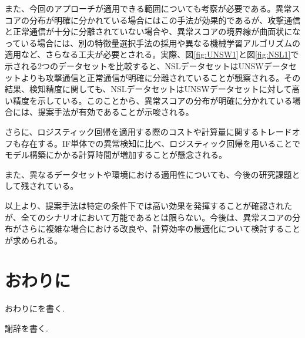 \documentclass{css}
\begin{document}
また、今回のアプローチが適用できる範囲についても考察が必要である。異常スコアの分布が明確に分かれている場合にはこの手法が効果的であるが、攻撃通信と正常通信が十分に分離されていない場合や、異常スコアの境界線が曲面状になっている場合には、別の特徴量選択手法の採用や異なる機械学習アルゴリズムの適用など、さらなる工夫が必要とされる。実際、図\ref{fig:UNSW1}と図\ref{fig:NSL1}で示される2つのデータセットを比較すると、NSLデータセットはUNSWデータセットよりも攻撃通信と正常通信が明確に分離されていることが観察される。その結果、検知精度に関しても、NSLデータセットはUNSWデータセットに対して高い精度を示している。このことから、異常スコアの分布が明確に分かれている場合には、提案手法が有効であることが示唆される。

さらに、ロジスティック回帰を適用する際のコストや計算量に関するトレードオフも存在する。IF単体での異常検知に比べ、ロジスティック回帰を用いることでモデル構築にかかる計算時間が増加することが懸念される。


また、異なるデータセットや環境における適用性についても、今後の研究課題として残されている。

以上より、提案手法は特定の条件下では高い効果を発揮することが確認されたが、全てのシナリオにおいて万能であるとは限らない。今後は、異常スコアの分布がさらに複雑な場合における改良や、計算効率の最適化について検討することが求められる。

\section{おわりに}
おわりにを書く.

\begin{acknowledgment}
謝辞を書く.\cite{AbuAlghanam2023-sx}
\end{acknowledgment}



\end{document}
